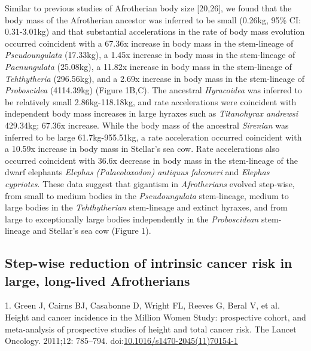 \documentclass[]{elsarticle} %
\begin{document}
Similar to previous studies of Afrotherian body size {[}20,26{]}, we
found that the body mass of the Afrotherian ancestor was inferred to be
small (0.26kg, 95\% CI: 0.31-3.01kg) and that substantial accelerations
in the rate of body mass evolution occurred coincident with a 67.36x
increase in body mass in the stem-lineage of \emph{Pseudoungulata}
(17.33kg), a 1.45x increase in body mass in the stem-lineage of
\emph{Paenungulata} (25.08kg), a 11.82x increase in body mass in the
stem-lineage of \emph{Tehthytheria} (296.56kg), and a 2.69x increase in
body mass in the stem-lineage of \emph{Proboscidea} (4114.39kg) (Figure
1B,C). The ancestral \emph{Hyracoidea} was inferred to be relatively
small 2.86kg-118.18kg, and rate accelerations were coincident with
independent body mass increases in large hyraxes such as
\emph{Titanohyrax andrewsi} 429.34kg; 67.36x increase. While the body
mass of the ancestral \emph{Sirenian} was inferred to be large
61.7kg-955.51kg, a rate acceleration occurred coincident with a 10.59x
increase in body mass in Stellar's sea cow. Rate accelerations also
occurred coincident with 36.6x decrease in body mass in the stem-lineage
of the dwarf elephants \emph{Elephas (Palaeoloxodon) antiquus falconeri}
and \emph{Elephas cypriotes}. These data suggest that gigantism in
\emph{Afrotherians} evolved step-wise, from small to medium bodies in
the \emph{Pseudoungulata} stem-lineage, medium to large bodies in the
\emph{Tehthytherian} stem-lineage and extinct hyraxes, and from large to
exceptionally large bodies independently in the \emph{Proboscidean}
stem-lineage and Stellar's sea cow (Figure 1).

\hypertarget{step-wise-reduction-of-intrinsic-cancer-risk-in-large-long-lived-afrotherians}{%
\subsection*{Step-wise reduction of intrinsic cancer risk in large,
long-lived
Afrotherians}\label{step-wise-reduction-of-intrinsic-cancer-risk-in-large-long-lived-afrotherians}}

\hypertarget{refs}{}
\leavevmode\hypertarget{ref-Green2011}{}%
1. Green J, Cairns BJ, Casabonne D, Wright FL, Reeves G, Beral V, et al.
Height and cancer incidence in the Million Women Study: prospective
cohort, and meta-analysis of prospective studies of height and total
cancer risk. The Lancet Oncology. 2011;12: 785--794.
doi:\href{https://doi.org/10.1016/s1470-2045(11)70154-1}{10.1016/s1470-2045(11)70154-1}
\end{document}
